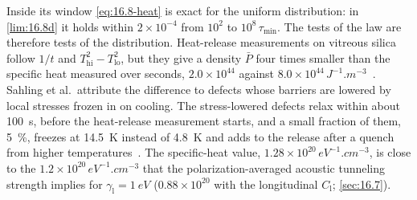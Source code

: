 Inside its window \cref{eq:16.8-heat} is exact for the uniform distribution: in \cref{lim:16.8d} it holds within $2\times10^{-4}$ from $10^2$ to $10^8\,\tau_{\min}$. The tests of the law are therefore tests of the distribution. Heat-release measurements on vitreous silica follow $1/t$ and $T_{\mathrm{hi}}^2 - T_{\mathrm{lo}}^2$, but they give a density $\bar P$ four times smaller than the specific heat measured over seconds, $2.0\times10^{44}$ against $8.0\times10^{44}\,\si{J^{-1}.m^{-3}}$~\cite[Table~1]{sahling2014anomalous}. Sahling et al.\ attribute the difference to defects whose barriers are lowered by local stresses frozen in on cooling. The stress-lowered defects relax within about \SI{100}{s}, before the heat-release measurement starts, and a small fraction of them, \SI{5}{\percent}, freezes at \SI{14.5}{K} instead of \SI{4.8}{K} and adds to the release after a quench from higher temperatures~\cite{sahling2014anomalous}. The specific-heat value, $1.28\times10^{20}\,\si{eV^{-1}.cm^{-3}}$, is close to the $1.2\times10^{20}\,\si{eV^{-1}.cm^{-3}}$ that the polarization-averaged acoustic tunneling strength implies for $\gamma_{\mathrm{l}} = \SI{1}{eV}$ ($0.88\times10^{20}$ with the longitudinal $C_{\mathrm{l}}$; \cref{sec:16.7}).

